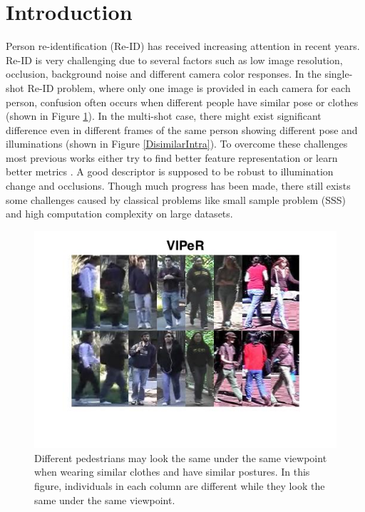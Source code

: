 \documentclass[10pt,twocolumn,letterpaper]{article}
\begin{document}
\section{Introduction}

Person re-identification (Re-ID) has received increasing attention in recent years. Re-ID is very challenging due to several factors such as low image resolution, occlusion, background noise and different camera color responses. In the single-shot Re-ID problem, where only one image is provided in each camera for each person, confusion often occurs when different people have similar pose or clothes (shown in Figure \ref{fig::SimilarInterC}). In the multi-shot case, there might exist significant difference even in different frames of the same person showing different pose and illuminations (shown in Figure \ref{DisimilarIntra}). To overcome these challenges most previous works either try to find better feature representation \cite{LOMO, GOG, RegionCovariance, SDALF} or learn better metrics \cite{KISSME, LFDA, PCCA, TDL, PRDC, LMNN, KLFDA, KCCA, KernelVersionMetrics, NFST, ITML}. A good descriptor is supposed to be robust to illumination change and occlusions. Though much progress has been made, there still exists some challenges caused by classical problems like small sample problem (SSS) and high computation complexity on large datasets.
\begin{figure} 
\centering
\includegraphics[width=0.8\linewidth]{SimilarInter.jpg}
\vspace{-2em}
\caption{Different pedestrians may look the same under the same viewpoint when wearing similar clothes and have similar postures. In this figure, individuals in each column are different while they look the same under the same viewpoint.}
\label{fig::SimilarInterC}

\end{figure}
\end{document}
